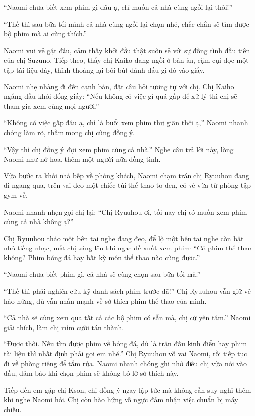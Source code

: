 \documentclass[../main.tex]{subfiles}
\begin{document}
``Naomi chưa biết xem phim gì đâu ạ, chỉ muốn cả nhà cùng ngồi lại thôi!''

``Thế thì sau bữa tối mình cả nhà cùng ngồi lại chọn nhé, chắc chắn sẽ tìm được bộ phim mà ai cũng thích.''

Naomi vui vẻ gật đầu, cảm thấy khởi đầu thật suôn sẻ với sự đồng tình đầu tiên của chị Suzuno. Tiếp theo, thấy chị Kaiho đang ngồi ở bàn ăn, cặm cụi đọc một tập tài liệu dày, thỉnh thoảng lại bôi bút đánh dấu gì đó vào giấy.

Naomi nhẹ nhàng đi đến cạnh bàn, đặt câu hỏi tương tự với chị. Chị Kaiho ngẩng đầu khỏi đống giấy: ``Nếu không có việc gì quá gấp để xử lý thì chị sẽ tham gia xem cùng mọi người.''

``Không có việc gấp đâu ạ, chỉ là buổi xem phim thư giãn thôi ạ,'' Naomi nhanh chóng làm rõ, thầm mong chị cũng đồng ý.

``Vậy thì chị đồng ý, đợi xem phim cùng cả nhà.'' Nghe câu trả lời này, lòng Naomi như nở hoa, thêm một người nữa đồng tình.

Vừa bước ra khỏi nhà bếp về phòng khách, Naomi chạm trán chị Ryuuhou đang đi ngang qua, trên vai đeo một chiếc túi thể thao to đen, có vẻ vừa từ phòng tập gym về. 

Naomi nhanh nhẹn gọi chị lại: ``Chị Ryuuhou ơi, tối nay chị có muốn xem phim cùng cả nhà không ạ?''

Chị Ryuuhou tháo một bên tai nghe đang đeo, để lộ một bên tai nghe còn bật nhỏ tiếng nhạc, mắt chị sáng lên khi nghe đề xuất xem phim: ``Có phim thể thao không? Phim bóng đá hay bất kỳ môn thể thao nào cũng được.''

``Naomi chưa biết phim gì, cả nhà sẽ cùng chọn sau bữa tối mà.''

``Thế thì phải nghiên cứu kỹ danh sách phim trước đã!'' Chị Ryuuhou vẫn giữ vẻ hào hứng, dù vẫn nhấn mạnh về sở thích phim thể thao của mình.

``Cả nhà sẽ cùng xem qua tất cả các bộ phim có sẵn mà, chị cứ yên tâm.'' Naomi giải thích, làm chị mỉm cười tán thành.

``Được thôi. Nếu tìm được phim về bóng đá, dù là trận đấu kinh điển hay phim tài liệu thì nhất định phải gọi em nhé.'' Chị Ryuuhou vỗ vai Naomi, rồi tiếp tục đi về phòng riêng để tắm rửa. Naomi nhanh chóng ghi nhớ điều chị vừa nói vào đầu, đảm bảo khi chọn phim sẽ không bỏ lỡ sở thích này.

Tiếp đến em gặp chị Kson, chị đồng ý ngay lập tức mà không cần suy nghĩ thêm khi nghe Naomi hỏi. Chị còn hào hứng vỗ ngực đảm nhận việc chuẩn bị máy chiếu.
\end{document}
